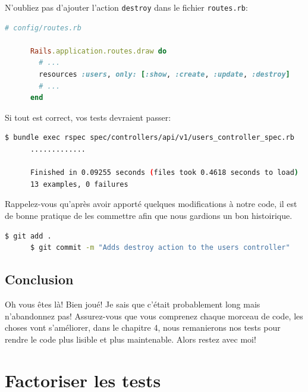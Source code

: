 \documentclass[]{report}
\begin{document}
      N'oubliez pas d'ajouter l'action \verb|destroy| dans le fichier \verb|routes.rb|:

      \begin{scriptsize}
      \begin{lstlisting}[language=ruby]
      # config/routes.rb

      Rails.application.routes.draw do
        # ...
        resources :users, only: [:show, :create, :update, :destroy]
        # ...
      end
      \end{lstlisting}
      \end{scriptsize}

      Si tout est correct, vos tests devraient passer:

      \begin{scriptsize}
      \begin{lstlisting}[language=bash]
      $ bundle exec rspec spec/controllers/api/v1/users_controller_spec.rb
      .............

      Finished in 0.09255 seconds (files took 0.4618 seconds to load)
      13 examples, 0 failures
      \end{lstlisting}
      \end{scriptsize}

      Rappelez-vous qu'après avoir apporté quelques modifications à notre code, il est de bonne pratique de les commettre afin que nous gardions un bon histoirique.

      \begin{scriptsize}
      \begin{lstlisting}[language=bash]
      $ git add .
      $ git commit -m "Adds destroy action to the users controller"
      \end{lstlisting}
      \end{scriptsize}


  \section{Conclusion}

    Oh vous êtes là! Bien joué! Je sais que c'était probablement  long mais n'abandonnez pas! Assurez-vous que vous comprenez chaque morceau de code, les choses vont s'améliorer, dans le chapitre 4, nous remanierons nos tests pour rendre le code plus lisible et plus maintenable. Alors restez avec moi!

\chapter{Factoriser les tests}\label{chapter:4}
\end{document}
